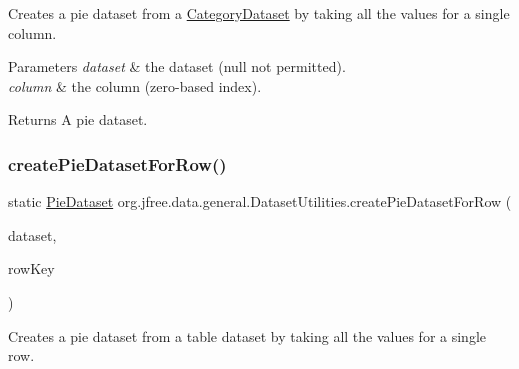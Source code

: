 Creates a pie dataset from a \mbox{\hyperlink{}{Category\+Dataset}} by taking all the values for a single column.


\begin{DoxyParams}{Parameters}
{\em dataset} & the dataset ({\ttfamily null} not permitted). \\
\hline
{\em column} & the column (zero-\/based index).\\
\hline
\end{DoxyParams}
\begin{DoxyReturn}{Returns}
A pie dataset. 
\end{DoxyReturn}
\mbox{\label{classorg_1_1jfree_1_1data_1_1general_1_1_dataset_utilities_a13d630d93744c0af9a69fe7edafeb740}} 
\subsubsection{\texorpdfstring{create\+Pie\+Dataset\+For\+Row()}{createPieDatasetForRow()}\hspace{0.1cm}{\footnotesize\ttfamily [1/2]}}
{\footnotesize\ttfamily static \mbox{\hyperlink{interfaceorg_1_1jfree_1_1data_1_1general_1_1_pie_dataset}{Pie\+Dataset}} org.\+jfree.\+data.\+general.\+Dataset\+Utilities.\+create\+Pie\+Dataset\+For\+Row (\begin{DoxyParamCaption}\item[{\mbox{\hyperlink{interfaceorg_1_1jfree_1_1data_1_1category_1_1_category_dataset}{Category\+Dataset}}}]{dataset,  }\item[{Comparable}]{row\+Key }\end{DoxyParamCaption})\hspace{0.3cm}{\ttfamily [static]}}

Creates a pie dataset from a table dataset by taking all the values for a single row.


